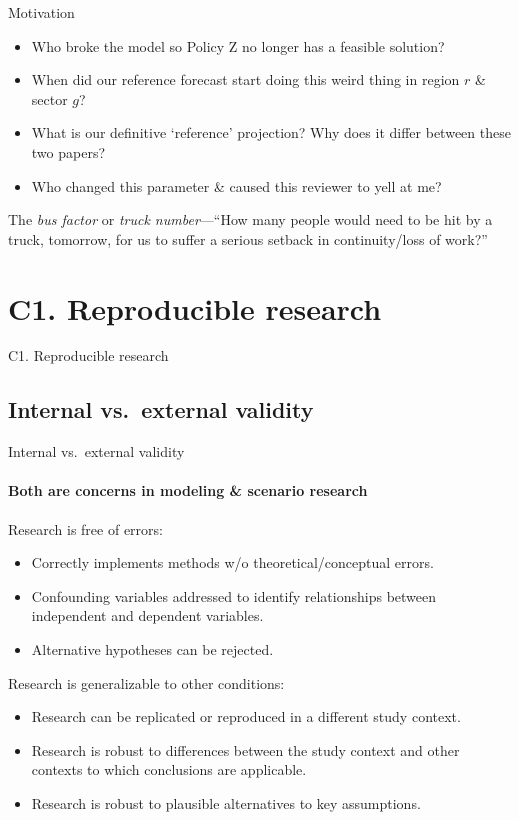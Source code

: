 \documentclass[12pt,aspectratio=169]{beamer}
\begin{document}
\begin{frame}{Motivation}

\begin{itemize}
  \item Who broke the model so Policy Z no longer has a feasible solution?
  \item When did our reference forecast start doing this weird thing in region $r$ \& sector $g$?
  \item What is our definitive ‘reference’ projection?
    Why does it differ between these two papers?
  \item Who changed this parameter \& caused this reviewer to yell at me?
\end{itemize}

\bigskip
{}

The \emph{bus factor} or \emph{truck number}—“How many people would need to be hit by a truck, tomorrow, for us to suffer a serious setback in continuity/loss of work?”

\end{frame}

\section{C1. Reproducible research}
\begin{frame}{C1. Reproducible research}
\tableofcontents[hideothersubsections]
\end{frame}

\subsection{Internal vs.\ external validity}
\begin{frame}{Internal vs.\ external validity}
\framesubtitle{Both are concerns in modeling \& scenario research}

 Research is free of errors:

\begin{itemize}
  \item Correctly implements methods w/o theoretical/conceptual errors.
  \item Confounding variables addressed to identify relationships between independent and dependent variables.
  \item Alternative hypotheses can be rejected.
\end{itemize}

\bigskip
{} Research is generalizable to other conditions:

\begin{itemize}
  \item Research can be replicated or reproduced in a different study context.
  \item Research is robust to differences between the study context and other contexts to which conclusions are applicable.
  \item Research is robust to plausible alternatives to key assumptions.
\end{itemize}

\end{frame}
\end{document}
